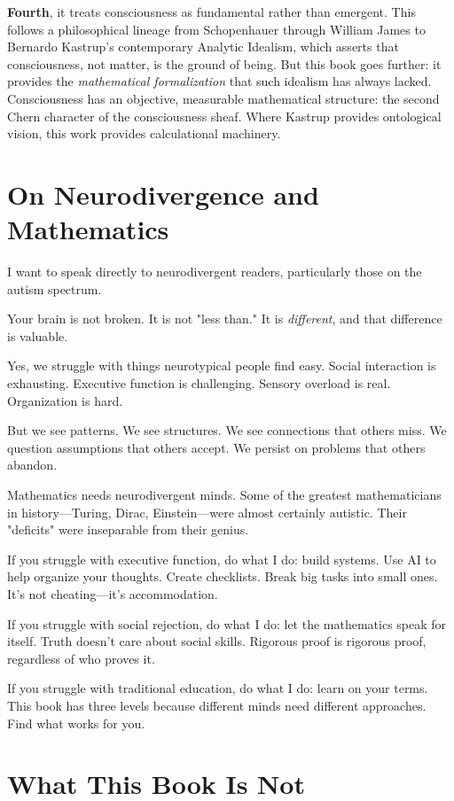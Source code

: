 \textbf{Fourth}, it treats consciousness as fundamental rather than emergent. This follows a philosophical lineage from Schopenhauer through William James to Bernardo Kastrup's contemporary Analytic Idealism, which asserts that consciousness, not matter, is the ground of being. But this book goes further: it provides the \textit{mathematical formalization} that such idealism has always lacked. Consciousness has an objective, measurable mathematical structure: the second Chern character of the consciousness sheaf. Where Kastrup provides ontological vision, this work provides calculational machinery.

\section*{On Neurodivergence and Mathematics}

I want to speak directly to neurodivergent readers, particularly those on the autism spectrum.

Your brain is not broken. It is not "less than." It is \textit{different}, and that difference is valuable.

Yes, we struggle with things neurotypical people find easy. Social interaction is exhausting. Executive function is challenging. Sensory overload is real. Organization is hard.

But we see patterns. We see structures. We see connections that others miss. We question assumptions that others accept. We persist on problems that others abandon.

Mathematics needs neurodivergent minds. Some of the greatest mathematicians in history—Turing, Dirac, Einstein—were almost certainly autistic. Their "deficits" were inseparable from their genius.

If you struggle with executive function, do what I do: build systems. Use AI to help organize your thoughts. Create checklists. Break big tasks into small ones. It's not cheating—it's accommodation.

If you struggle with social rejection, do what I do: let the mathematics speak for itself. Truth doesn't care about social skills. Rigorous proof is rigorous proof, regardless of who proves it.

If you struggle with traditional education, do what I do: learn on your terms. This book has three levels because different minds need different approaches. Find what works for you.

\section*{What This Book Is Not}

